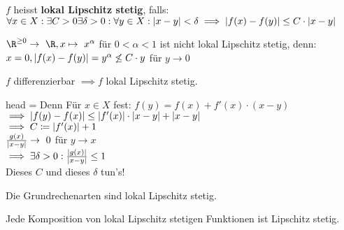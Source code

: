 \begin{def*}[note = lokal Lipschitz stetig , index = lokal Lipschitz stetig , indexformat = {3!2~!1~ 2!~3!1~}]
	$f$ heisst \textbf{lokal Lipschitz stetig}, falls: \\
	$\forall x \in X : \exists C > 0 \exists \delta >0 : \forall y \in X : \abs{x-y} < \delta \implies \abs{f(x)-f(y)} \leq C \cdot \abs{x-y}$
\end{def*}
\begin{bsp*}
	$\R^{\geq 0} \rightarrow \R , x \mapsto x^\alpha$ für $0 < \alpha < 1$ ist nicht lokal Lipschitz stetig, denn: \\
	$x = 0 , \abs{f(x)-f(y)} = y^\alpha \not\leq C \cdot y$ für $y \rightarrow 0$
\end{bsp*}
\begin{bem}
	$f$ differenzierbar $\implies f$ lokal Lipschitz stetig. \\
	\begin{bew}{head = Denn}
		Für $x \in X$ fest: $f(y) = f(x) + f'(x) \cdot (x-y)$ \\
		$\implies \abs{f(y)-f(x)} \leq \abs{f'(x)} \cdot \abs{x-y} + \abs{x-y}$ \\
		$\implies C \coloneqq \abs{f'(x)} + 1$ \\
		$\frac{g(x)}{\abs{x-y}} \rightarrow 0$ für $y \rightarrow x$ \\
		$\implies \exists \delta > 0 : \frac{\abs{g(x)}}{\abs{x-y}} \leq 1$ \\
		Dieses $C$ und dieses $\delta$ tun's!
	\end{bew}
\end{bem}
\begin{bem}
	Die Grundrechenarten sind lokal Lipschitz stetig.
\end{bem}
\begin{bem}
	Jede Komposition von lokal Lipschitz stetigen Funktionen ist Lipschitz stetig.
\end{bem}
